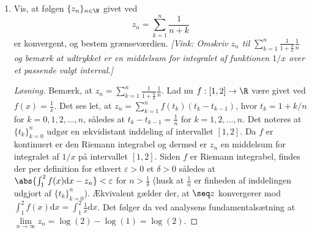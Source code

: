 \begin{opg}
\begin{enumerate}
		
		\item Vis, at f\o{}lgen $\{z_n\}_{n\in\N}$ givet ved
		\[
		z_n=\sum_{k=1}^n\frac1{n+k}
		\]	
		er konvergent, og bestem gr\ae{}nsev\ae{}rdien. \textsl{[Vink: Omskriv 
			$
			z_n$ til $\sum_{k=1}^n\frac1{1+\frac kn}\frac 1n
			$
			og bem\ae{}rk at udtrykket er en middelsum for integralet af funktionen $1/x$ over et passende valgt interval.]}
		
		
		\ifanswers \begin{proof}[Løsning]
			Bemærk, at $ z_n=\sum_{k=1}^{n}\frac{1}{1+\frac{k}{n}}\frac{1}{n} $. Lad nu $ f: [1,2]\to \R $ være givet ved $ f(x)=\frac{1}{x} $. Det ses let, at $ z_n=\sum_{k=1}^{n}f(t_k)(t_k-t_{k-1}) $, hvor $t_k=1+k/n $ for $ k=0,1,2,...,n $, således at $ t_k-t_{k-1}=\frac{1}{n} $ for $ k=1,2,...,n $. Det noteres at $ \{t_k\}_{k=0}^{n} $ udgør en ækvidistant inddeling af intervallet $ [1,2] $. Da $ f $ er kontinuert er den Riemann integrabel og dermed er $ z_n $ en middelsum for integralet af $ 1/x $ på intervallet $ [1,2] $. Siden $ f $ er Riemann integrabel, findes der per definition for ethvert $ \varepsilon>0 $ et $ \delta>0 $ således at $ \abs{\int_{1}^{2}f(x)\text{d} x-z_n}<\varepsilon $ for $ n>\frac{1}{\delta} $ (husk at $ \frac{1}{n} $ er finheden af inddelingen udgjort af $ \{t_k\}_{k=0}^{n} $). Ækvivalent gælder der, at $ \seq z $ konvergerer mod $ \int_{1}^{2} f(x)\text{d} x=\int_{1}^{2} \frac{1}{x}\text{d} x $. Det følger da ved analysens fundamentalsætning at $ \lim\limits_{n\to\infty}z_n=\log(2)-\log(1)=\log(2) $.
		\end{proof} \fi
	\end{enumerate}
\end{opg}
